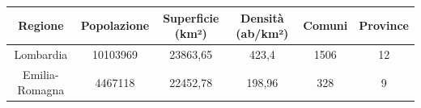 \documentclass[
  12pt,
]{article}
\begin{document}
\begin{table}[H]
\begin{tabular}{|c|c|c|c|c|c|}
\hline
\textbf{Regione} & \textbf{Popolazione} & \textbf{Superficie (km²)} & \textbf{Densità (ab/km²)} & \textbf{Comuni} & \textbf{Province} \\ \hline
Lombardia        & 10103969             & 23863,65                  & 423,4                     & 1506            & 12                 \\ \hline
Emilia-Romagna   & 4467118              & 22452,78                  & 198,96                    & 328             & 9                  \\ \hline
\end{tabular}

\end{table}
\end{document}
